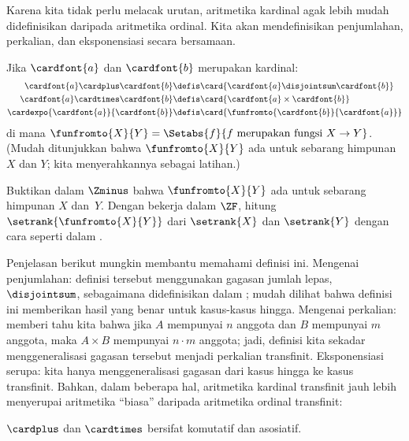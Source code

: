 \documentclass[../../../include/open-logic-section]{subfiles}
\begin{document}

Karena kita tidak perlu melacak urutan, aritmetika kardinal agak lebih mudah
didefinisikan daripada aritmetika ordinal. Kita akan mendefinisikan
penjumlahan, perkalian, dan eksponensiasi secara bersamaan.

\begin{defn}
Jika $\cardfont{a}$ dan $\cardfont{b}$ merupakan kardinal:
\begin{align*}
	\cardfont{a} \cardplus \cardfont{b} &\defis 
	\card{\cardfont{a} \disjointsum \cardfont{b}}\\
	\cardfont{a} \cardtimes \cardfont{b} &\defis 
	\card{\cardfont{a} \times \cardfont{b}}\\
	\cardexpo{\cardfont{a}}{\cardfont{b}} &\defis 
	\card{\funfromto{\cardfont{b}}{\cardfont{a}}}
\end{align*}
di mana $\funfromto{X}{Y} = \Setabs{f}{f \text{ merupakan fungsi } X \to Y}$.
(Mudah ditunjukkan bahwa $\funfromto{X}{Y}$ ada untuk sebarang himpunan $X$
dan $Y$; kita menyerahkannya sebagai latihan.)
\end{defn}

\begin{prob}
Buktikan dalam $\Zminus$ bahwa $\funfromto{X}{Y}$ ada untuk sebarang himpunan
$X$ dan~$Y$. Dengan bekerja dalam $\ZF$, hitung
$\setrank{\funfromto{X}{Y}}$ dari $\setrank{X}$ dan $\setrank{Y}$ dengan cara
seperti dalam .
\end{prob}

Penjelasan berikut mungkin membantu memahami definisi ini. Mengenai
penjumlahan: definisi tersebut menggunakan gagasan jumlah lepas,
$\disjointsum$, sebagaimana didefinisikan dalam
; mudah dilihat bahwa definisi ini
memberikan hasil yang benar untuk kasus-kasus hingga. Mengenai perkalian:
 memberi tahu kita bahwa jika $A$ mempunyai
$n$ anggota dan $B$ mempunyai $m$ anggota, maka $A \times B$ mempunyai
$n \cdot m$ anggota; jadi, definisi kita sekadar menggeneralisasi gagasan
tersebut menjadi perkalian transfinit. Eksponensiasi serupa: kita hanya
menggeneralisasi gagasan dari kasus hingga ke kasus transfinit. Bahkan, dalam
beberapa hal, aritmetika kardinal transfinit jauh lebih menyerupai aritmetika
``biasa'' daripada aritmetika ordinal transfinit:

\begin{prop}
$\cardplus$ dan $\cardtimes$ bersifat komutatif dan asosiatif.
\end{prop}
\end{document}
